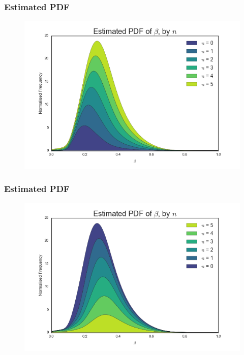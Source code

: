\documentclass{beamer}
\begin{document}
\begin{frame}
\frametitle{Estimated PDF}
\begin{figure}
	\includegraphics[width=\textwidth]{gaussian_1}
\end{figure}
\end{frame}

\begin{frame}
\frametitle{Estimated PDF}
\begin{figure}
	\includegraphics[width=\textwidth]{gaussian_2}
\end{figure}
\end{frame}
\end{document}

